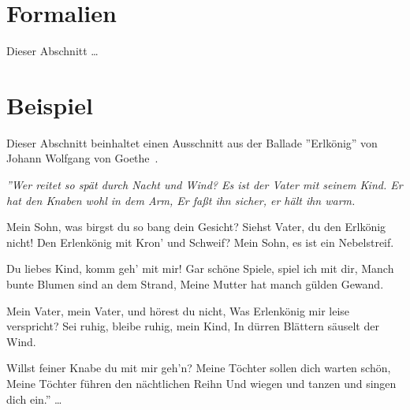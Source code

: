 \section{Formalien}

Dieser Abschnitt \dots

\section{Beispiel}

Dieser Abschnitt beinhaltet einen Ausschnitt aus der Ballade ''Erlkönig'' von Johann Wolfgang von Goethe~\cite{Goethe1782}.


{\it ''Wer reitet so spät durch Nacht und Wind? Es ist der Vater mit seinem Kind.
Er hat den Knaben wohl in dem Arm, Er faßt ihn sicher, er hält ihn warm.

Mein Sohn, was birgst du so bang dein Gesicht?
Siehst Vater, du den Erlkönig nicht!
Den Erlenkönig mit Kron' und Schweif?
Mein Sohn, es ist ein Nebelstreif.

Du liebes Kind, komm geh' mit mir!
Gar schöne Spiele, spiel ich mit dir,
Manch bunte Blumen sind an dem Strand,
Meine Mutter hat manch gülden Gewand.

Mein Vater, mein Vater, und hörest du nicht,
Was Erlenkönig mir leise verspricht?
Sei ruhig, bleibe ruhig, mein Kind,
In dürren Blättern säuselt der Wind.

Willst feiner Knabe du mit mir geh'n?
Meine Töchter sollen dich warten schön,
Meine Töchter führen den nächtlichen Reihn
Und wiegen und tanzen und singen dich ein.''
\dots
}

